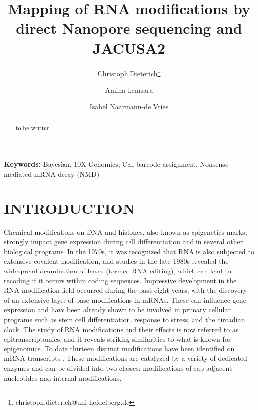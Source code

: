 \documentclass[times, 11pt, a4paper]{article}
\begin{document}
\providecommand{\keywords}[1]{\textbf{Keywords:} #1}

\title{\Large Mapping of RNA modifications by direct Nanopore sequencing and JACUSA2}

\date{}
\author[1,2,3]{Christoph Dieterich\thanks{christoph.dieterich@uni-heidelberg.de}}
\author[1,2]{Amina Lemsara}%
\author[1,2,3]{Isabel Naarmann-de Vries}%




\maketitle

\begin{abstract} %
to be written
\end{abstract}

\keywords{Bayesian, 10X Genomics, Cell barcode assignment, Nonsense-mediated mRNA decay (NMD)}

\section*{INTRODUCTION}
Chemical modifications on DNA and histones, also known as epigenetics marks, strongly impact gene expression during cell differentiation and in several other biological programs. In the 1970s, it was recognized that RNA is also subjected to extensive covalent modification, and studies in the late 1980s revealed the widespread deamination of bases (termed RNA editing), which can lead to recoding if it occurs within coding sequences. Impressive development in the RNA modification field occurred during the past eight years, with the discovery of an extensive layer of base modifications in mRNAs. These can influence gene expression and have been already shown to be involved in primary cellular programs such as stem cell differentiation, response to stress, and the circadian clock. The study of RNA modifications and their effects is now referred to as epitranscriptomics, and it reveals striking similarities to what is known for epigenomics.
To date thirteen distinct modifications have been identified on mRNA transcripts \citep{Anreiter2021}. These modifications are catalyzed by a variety of dedicated enzymes and can be divided into two classes: modifications of cap-adjacent nucleotides and internal modifications. 
\end{document}

